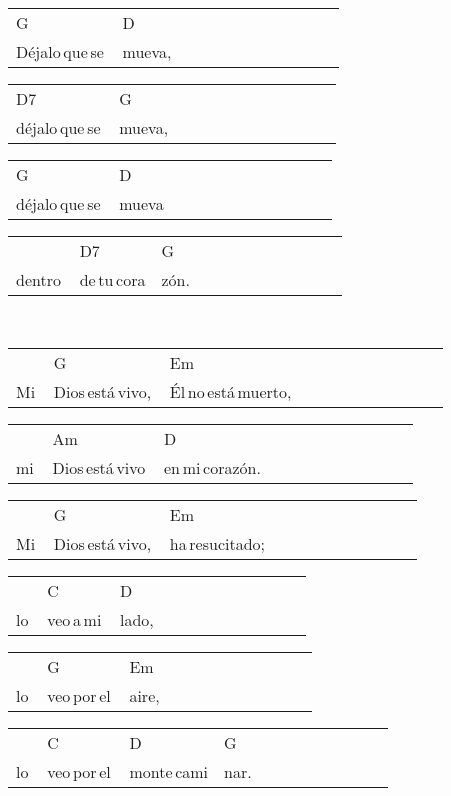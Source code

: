 \begin{multicols}{2}
\begin{minipage}{\columnwidth}
\noindent
\begin{tabular}{llllllllllll}
G&D\\
Déjalo\,que\,se\,&mueva,
\end{tabular}

\noindent
\begin{tabular}{llllllllllll}
D7&G\\
déjalo\,que\,se\,&mueva,
\end{tabular}

\noindent
\begin{tabular}{llllllllllll}
G&D\\
déjalo\,que\,se\,&mueva
\end{tabular}

\noindent
\begin{tabular}{llllllllllll}
&D7&G\\
dentro\,&de\,tu\,cora&zón.
\end{tabular}
\end{minipage}\\

\noindent
\begin{minipage}{\columnwidth}
\noindent
\noindent
\begin{tabular}{llllllllllll}
&G&Em\\
Mi\,&Dios\,está\,vivo,\,&Él\,no\,está\,muerto,
\end{tabular}

\noindent
\begin{tabular}{llllllllllll}
&Am&D\\
mi\,&Dios\,está\,vivo\,&en\,mi\,corazón.
\end{tabular}

\noindent
\begin{tabular}{llllllllllll}
&G&Em\\
Mi\,&Dios\,está\,vivo,\,&ha\,resucitado;
\end{tabular}

\noindent
\begin{tabular}{llllllllllll}
&C&D\\
lo\,&veo\,a\,mi\,&lado,
\end{tabular}

\noindent
\begin{tabular}{llllllllllll}
&G&Em\\
lo\,&veo\,por\,el\,&aire,
\end{tabular}

\noindent
\begin{tabular}{llllllllllll}
&C&D&G\\
lo\,&veo\,por\,el\,&monte\,cami&nar.
\end{tabular}
\end{minipage}\\


\chorus{}

\end{multicols}